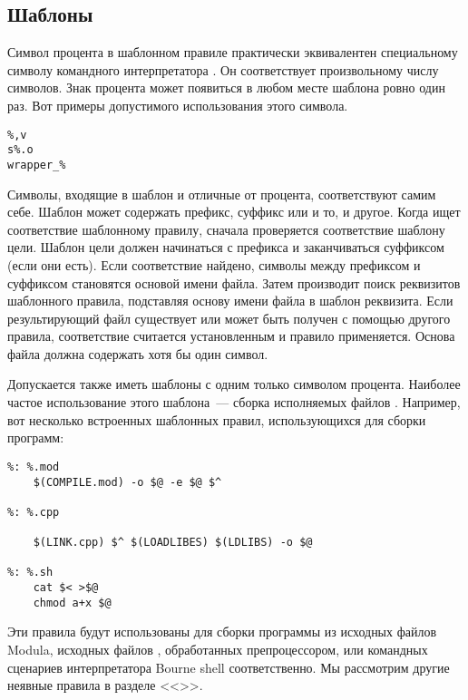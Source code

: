 \subsection{Шаблоны}
Символ процента в шаблонном правиле практически эквивалентен
специальному символу \command{*} командного интерпретатора \UNIX{}. Он
соответствует произвольному числу символов. Знак процента может
появиться в любом месте шаблона ровно один раз. Вот примеры
допустимого использования этого символа.

{\footnotesize
\begin{verbatim}
%,v
s%.o
wrapper_%
\end{verbatim}
}

Символы, входящие в шаблон и отличные от процента, соответствуют самим
себе.  Шаблон может содержать префикс, суффикс или и то, и другое.
Когда \GNUmake{} ищет соответствие шаблонному правилу, сначала
проверяется соответствие шаблону цели. Шаблон цели должен начинаться с
префикса и заканчиваться суффиксом (если они есть). Если соответствие
найдено, символы между префиксом и суффиксом становятся основой имени
файла. Затем \GNUmake{} производит поиск реквизитов шаблонного
правила, подставляя основу имени файла в шаблон реквизита. Если
результирующий файл существует или может быть получен с помощью
другого правила, соответствие считается установленным и правило
применяется. Основа файла должна содержать хотя бы один символ.

Допускается также иметь шаблоны с одним только символом процента.
Наиболее частое использование этого шаблона~--- сборка исполняемых
файлов \UNIX{}. Например, вот несколько встроенных шаблонных правил,
использующихся \GNUmake{} для сборки программ:

{\footnotesize
\begin{verbatim}
%: %.mod
    $(COMPILE.mod) -o $@ -e $@ $^

%: %.cpp

    $(LINK.cpp) $^ $(LOADLIBES) $(LDLIBS) -o $@

%: %.sh
    cat $< >$@
    chmod a+x $@
\end{verbatim}
}

Эти правила будут использованы для сборки программы из исходных файлов
Modula, исходных файлов \Clang{}, обработанных препроцессором, или
командных сценариев интерпретатора Bourne shell соответственно. Мы
рассмотрим другие неявные правила в разделе
<<>>.


